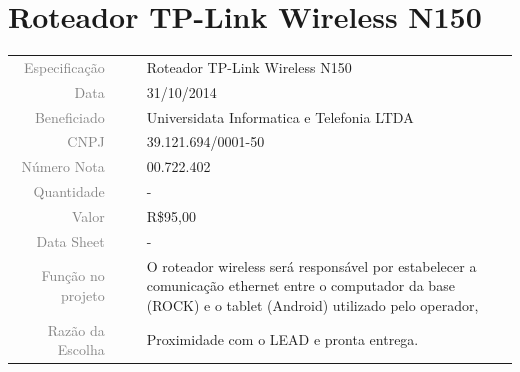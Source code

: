 

\section{Roteador TP-Link Wireless N150}
\label{roteador_01}


\begin{table}[ht!]

	\begin{tabular}{r l|l p{12cm} }
		
		\textcolor{gray}{Especificação} &&& 	{Roteador TP-Link Wireless N150}\\
		\textcolor{gray}{Data} &&& 				{31/10/2014}\\
        \textcolor{gray}{Beneficiado} &&&		{Universidata Informatica e
        Telefonia LTDA}
        \\
        \textcolor{gray}{CNPJ} &&& 				{39.121.694/0001-50} \\
        \textcolor{gray}{Número Nota} &&& 		{00.722.402} \\
		\textcolor{gray}{Quantidade} &&& 		{-} \\
		\textcolor{gray}{Valor} &&& 			{R\$95,00} \\
		\textcolor{gray}{Data Sheet} &&& 		{-} \\

		\textcolor{gray}{Função no projeto} &&& {O roteador wireless será responsável
		por estabelecer a comunicação ethernet entre o computador da base (ROCK) e o
		tablet (Android) utilizado pelo operador,}
		\\
		\textcolor{gray}{Razão da Escolha} &&& {Proximidade com o LEAD e pronta
		entrega.}

	\end{tabular}
\end{table}

\newpage
